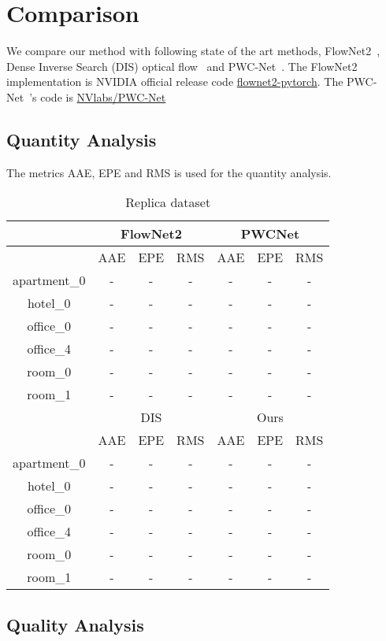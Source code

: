 \section{Comparison}

We compare our method with following state of the art methods, FlowNet2~\cite{ilg2017flownet}, Dense Inverse Search (DIS) optical flow~\cite{kroeger2016fast} and PWC-Net~\cite{sun2018pwc}. 
The FlowNet2~\cite{ilg2017flownet} implementation is NVIDIA official release code \href{https://github.com/NVIDIA/flownet2-pytorch}{flownet2-pytorch}.
The PWC-Net~\cite{sun2018pwc}'s code is \href{https://github.com/NVlabs/PWC-Net}{NVlabs/PWC-Net}

\subsection{Quantity Analysis}

The metrics AAE, EPE and RMS is used for the quantity analysis.


\begin{table}[h!]
	\centering
	\begin{tabular}{ c | c | c | c | c | c | c }
		\hline
		     & \multicolumn{3}{c|}{FlowNet2} & \multicolumn{3}{c}{PWCNet} \\
		\hline
			 & AAE & EPE & RMS & AAE & EPE & RMS \\
		\hline
		apartment\_0 & - & - & -  & - & - & -  \\ 
		\hline
		hotel\_0 & - & - & -  & - & - & -  \\ 
		\hline
		office\_0 & - & - & - & - & - & -  \\ 
		\hline
		office\_4 & - & - & -  & - & - & -  \\ 
		\hline
		room\_0 & - & - & - & - & - & -  \\ 
		\hline
		room\_1 & - & - & -  & - & - & -  \\ 
		\hline\hline
			& \multicolumn{3}{c|}{DIS} & \multicolumn{3}{c}{Ours} \\
		\hline
			& AAE & EPE & RMS & AAE & EPE & RMS \\
		\hline
		apartment\_0 & - & - & -  & - & - & -  \\ 
		\hline
		hotel\_0 & - & - & -  & - & - & -  \\ 
		\hline
		office\_0 & - & - & - & - & - & -  \\ 
		\hline
		office\_4 & - & - & -  & - & - & -  \\ 
		\hline
		room\_0 & - & - & - & - & - & -  \\ 
		\hline
		room\_1 & - & - & -  & - & - & -  \\ 
		\hline
	\end{tabular}
	\caption{Replica dataset}
	\label{fig:exp:quality}
\end{table}

\subsection{Quality Analysis}





